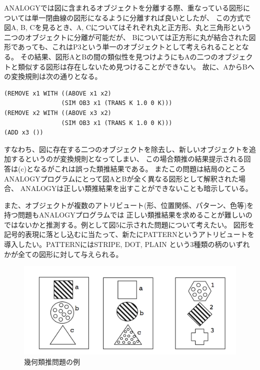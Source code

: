 \documentclass[uplatex]{jsarticle}
\begin{document}
ANALOGYでは図に含まれるオブジェクトを分離する際、重なっている図形については単一閉曲線の図形になるように分離すれば良いとしたが、
この方式で図A, B, Cを見るとき、A, Cについてはそれぞれ丸と正方形、丸と三角形という二つのオブジェクトに分離が可能だが、
Bについては正方形に丸が結合された図形であっても、これはP3という単一のオブジェクトとして考えられることとなる。
その結果、図形AとBの間の類似性を見つけようにもAの二つのオブジェクトと類似する図形は存在しないため見つけることができない。
故に、AからBへの変換規則は次の通りとなる。

\begin{lstlisting}[basicstyle=\ttfamily\footnotesize, frame=single]
(REMOVE x1 WITH ((ABOVE x1 x2)
                (SIM OB3 x1 (TRANS K 1.0 0 K)))
(REMOVE x2 WITH ((ABOVE x3 x2)
                (SIM OB3 x1 (TRANS K 1.0 0 K)))
(ADD x3 ())
\end{lstlisting}

すなわち、図に存在する二つのオブジェクトを除去し、新しいオブジェクトを追加するというのが変換規則となってしまい、
この場合類推の結果提示される回答は(c)となるがこれは誤った類推結果である。
またこの問題は結局のところANALOGYプログラムにとって図AとBが全く異なる図形として解釈された場合、
ANALOGYは正しい類推結果を出すことができないことも暗示している。

また、オブジェクトが複数のアトリビュート(形、位置関係、パターン、色等)を持つ問題もANALOGYプログラムでは
正しい類推結果を求めることが難しいのではないかと推測する。例として図5に示された問題について考えたい。
図形を記号的表現に落とし込むに当たって、新たにPATTERNというアトリビュートを導入したい。PATTERNにはSTRIPE, DOT, PLAIN
という3種類の柄のいずれかが全ての図形に対して与えられる。

\begin{figure}
  \begin{center}
    \includegraphics[width=13cm]{img/difficult_example2.png}
    \caption{幾何類推問題の例}
  \end{center}
\end{figure}
\end{document}
